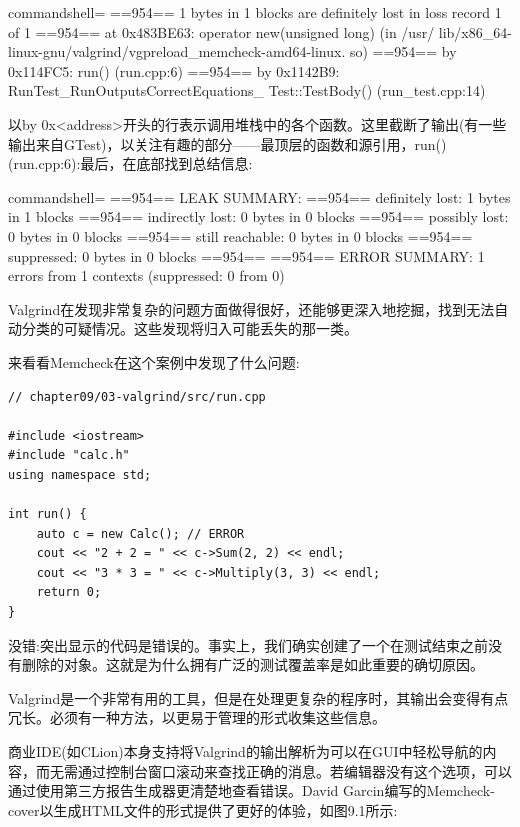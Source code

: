 \begin{tcblisting}{commandshell={}}
==954== 1 bytes in 1 blocks are definitely lost in loss record
1 of 1
==954== at 0x483BE63: operator new(unsigned long) (in /usr/
lib/x86_64-linux-gnu/valgrind/vgpreload_memcheck-amd64-linux.
so)
==954== by 0x114FC5: run() (run.cpp:6)
==954== by 0x1142B9: RunTest_RunOutputsCorrectEquations_
Test::TestBody() (run_test.cpp:14)
\end{tcblisting}

以by 0x<address>开头的行表示调用堆栈中的各个函数。这里截断了输出(有一些输出来自GTest)，以关注有趣的部分——最顶层的函数和源引用，run()(run.cpp:6):最后，在底部找到总结信息:

\begin{tcblisting}{commandshell={}}
==954== LEAK SUMMARY:
==954==     definitely lost: 1 bytes in 1 blocks
==954==     indirectly lost: 0 bytes in 0 blocks
==954==       possibly lost: 0 bytes in 0 blocks
==954==     still reachable: 0 bytes in 0 blocks
==954==          suppressed: 0 bytes in 0 blocks
==954==
==954== ERROR SUMMARY: 1 errors from 1 contexts (suppressed: 0
from 0)
\end{tcblisting}

Valgrind在发现非常复杂的问题方面做得很好，还能够更深入地挖掘，找到无法自动分类的可疑情况。这些发现将归入可能丢失的那一类。

来看看Memcheck在这个案例中发现了什么问题:

\begin{lstlisting}[style=styleCXX]
// chapter09/03-valgrind/src/run.cpp

#include <iostream>
#include "calc.h"
using namespace std;

int run() {
	auto c = new Calc(); // ERROR
	cout << "2 + 2 = " << c->Sum(2, 2) << endl;
	cout << "3 * 3 = " << c->Multiply(3, 3) << endl;
	return 0;
}
\end{lstlisting}

没错:突出显示的代码是错误的。事实上，我们确实创建了一个在测试结束之前没有删除的对象。这就是为什么拥有广泛的测试覆盖率是如此重要的确切原因。

Valgrind是一个非常有用的工具，但是在处理更复杂的程序时，其输出会变得有点冗长。必须有一种方法，以更易于管理的形式收集这些信息。


商业IDE(如CLion)本身支持将Valgrind的输出解析为可以在GUI中轻松导航的内容，而无需通过控制台窗口滚动来查找正确的消息。若编辑器没有这个选项，可以通过使用第三方报告生成器更清楚地查看错误。David Garcin编写的Memcheck-cover以生成HTML文件的形式提供了更好的体验，如图9.1所示:

